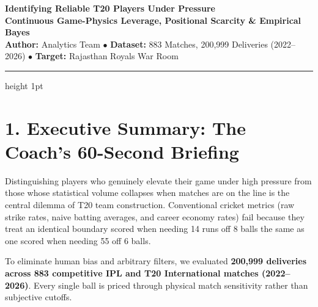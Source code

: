 \documentclass[10pt,a4paper]{article}
\begin{document}
\begin{center}
    {\Large\bfseries\color{rrnavy} Identifying Reliable T20 Players Under Pressure}\\[2pt]
    {\normalsize\bfseries\color{rrpink} Continuous Game-Physics Leverage, Positional Scarcity \& Empirical Bayes}\\[3pt]
    \footnotesize\textbf{Author:} Analytics Team \quad $\bullet$ \quad \textbf{Dataset:} 883 Matches, 200,999 Deliveries (2022--2026) \quad $\bullet$ \quad \textbf{Target:} Rajasthan Royals War Room
\end{center}
\vspace{-6pt}
\hrule height 1pt
\vspace{6pt}

\section*{1. Executive Summary: The Coach's 60-Second Briefing}

Distinguishing players who genuinely elevate their game under high pressure from those whose statistical volume collapses when matches are on the line is the central dilemma of T20 team construction. Conventional cricket metrics (raw strike rates, naive batting averages, and career economy rates) fail because they treat an identical boundary scored when needing 14 runs off 8 balls the same as one scored when needing 55 off 6 balls.

To eliminate human bias and arbitrary filters, we evaluated \textbf{200,999 deliveries across 883 competitive IPL and T20 International matches (2022--2026)}. Every single ball is priced through physical match sensitivity rather than subjective cutoffs.
\end{document}
